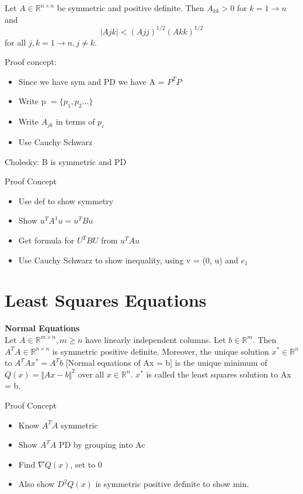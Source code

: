 \documentclass{article}
\begin{document}
\begin{prop} 
Let $A \in \mathbb{R}^{n \times n}$ be symmetric and positive definite. Then $A_{kk} > 0 $ for $k=1 \to n$ and
$$|Ajk| < (Ajj)^{1/2}(Akk)^{1/2} $$ for all $j, k = 1 \to n, j \ne k$.

\end{prop}
Proof concept:
\begin{itemize}
    \item Since we have sym and PD we have A = $P^TP$
    \item Write p $= \{ p_1, p_2 ... \}$
    \item Write $A_{jk}$ in terms of $p_i$
    \item Use Cauchy Schwarz
\end{itemize}
\begin{theorem} Cholesky: B is symmetric and PD
\end{theorem}
Proof Concept
\begin{itemize}
    \item Use def to show symmetry
    \item Show $u^TA^{1}u = u^TBu$
    \item Get formula for $U^TBU$ from $u^TAu$
    \item Use Cauchy Schwarz to show inequality, using v = (0, u) and $e_1$
\end{itemize}
\section{Least Squares Equations}
\begin{theorem} \textbf{Normal Equations} \\
Let $A \in \mathbb{R}^{m \times n}, m \geq n$ have linearly independent columns. Let $b \in \mathbb{R}^m$. Then $A^T A \in \mathbb{R}^{n \times n}$ is symmetric positive definite. Moreover, the unique solution $x^{*} \in \mathbb{R}^n$ to $A^T Ax^{*}  = A^T b$ [Normal equations of Ax = b] is the unique minimum of $Q(x) = \Vert Ax - b \Vert^2 $ over all $x \in \mathbb{R}^n$. $x^{*}$ is called the least squares solution to Ax = b.
\end{theorem}
Proof Concept
\begin{itemize}
    \item Know $A^TA$ symmetric
    \item Show $A^TA$ PD by grouping into Ac
    \item Find $\nabla Q(x)$, set to 0
    \item Also show $D^2 Q(x)$ is symmetric positive definite to show min.
\end{itemize}
\end{document}
